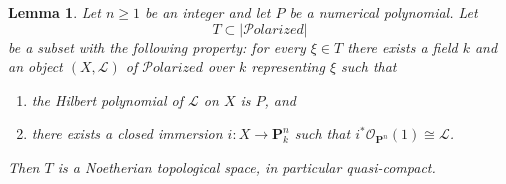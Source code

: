 \documentclass[10pt,a4paper]{amsart}
\theoremstyle{plain}
\newtheorem{lemma}[subsection]{Lemma}
\theoremstyle{definition}
\theoremstyle{remark}
\numberwithin{equation}{subsection}
\def\Polarizedstack{\mathcal{P}\!\mathit{olarized}}
\begin{document}
\begin{lemma}
\label{lemma-bounded-polarized}
Let $n \geq 1$ be an integer and let $P$ be a numerical polynomial.
Let
$$
T \subset |\Polarizedstack|
$$
be a subset with the following property: for every $\xi \in T$
there exists a field $k$ and an object $(X, \mathcal{L})$
of $\Polarizedstack$ over $k$ representing $\xi$ such that
\begin{enumerate}
\item the Hilbert polynomial of $\mathcal{L}$ on $X$ is $P$, and
\item there exists a closed immersion $i : X \to \mathbf{P}^n_k$
such that $i^*\mathcal{O}_{\mathbf{P}^n}(1) \cong \mathcal{L}$.
\end{enumerate}
Then $T$ is a Noetherian topological space, in particular quasi-compact.
\end{lemma}
\end{document}
